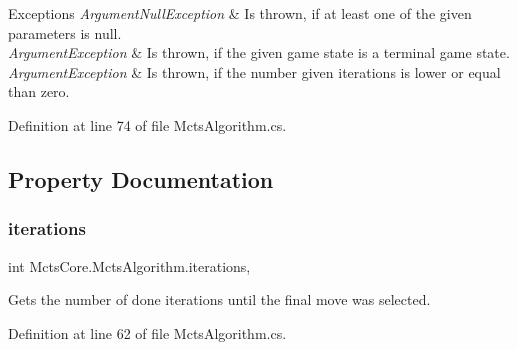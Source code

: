 \begin{DoxyExceptions}{Exceptions}
{\em Argument\+Null\+Exception} & Is thrown, if at least one of the given parameters is null.\\
\hline
{\em Argument\+Exception} & Is thrown, if the given game state is a terminal game state.\\
\hline
{\em Argument\+Exception} & Is thrown, if the number given iterations is lower or equal than zero.\\
\hline
\end{DoxyExceptions}


Definition at line 74 of file Mcts\+Algorithm.\+cs.



\subsection{Property Documentation}
\mbox{\label{class_mcts_core_1_1_mcts_algorithm_ae871efb153533b29759ac01fbb2845ab}} 
\subsubsection{\texorpdfstring{iterations}{iterations}}
{\footnotesize\ttfamily int Mcts\+Core.\+Mcts\+Algorithm.\+iterations\hspace{0.3cm}{\ttfamily [static]}, {\ttfamily [get]}}



Gets the number of done iterations until the final move was selected. 



Definition at line 62 of file Mcts\+Algorithm.\+cs.

